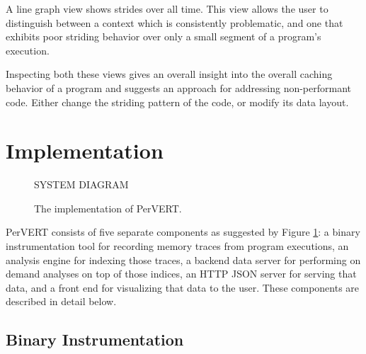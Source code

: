 \documentclass[annual]{acmsiggraph}
\begin{document}
    A line graph view shows strides over all time.
    This view allows the user to distinguish between a context which is consistently problematic, 
      and one that exhibits poor striding behavior over only a small segment of a program's execution.

    Inspecting both these views gives an overall insight into the overall caching behavior of a program 
      and suggests an approach for addressing non-performant code.
    Either change the striding pattern of the code, or modify its data layout.

\section {Implementation}\label{ch_i}

	\begin{figure}[t]
		\centering
    SYSTEM DIAGRAM
		\caption{The implementation of PerVERT.}
    \label{fig:system}
	\end{figure}

  PerVERT consists of five separate components as suggested by Figure \ref{fig:system}:
    a binary instrumentation tool for recording memory traces from program executions,
    an analysis engine for indexing those traces,
    a backend data server for performing on demand analyses on top of those indices,
    an HTTP JSON server for serving that data,
    and a front end for visualizing that data to the user.
  These components are described in detail below.  

  \subsection{Binary Instrumentation}
\end{document}
